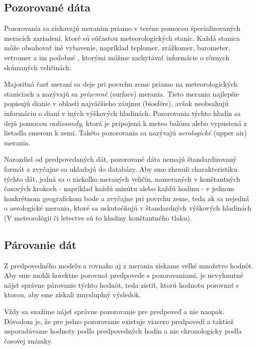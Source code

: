 \subsection{Pozorované dáta}
Pozorovania sa získavajú meraním priamo v teréne pomocou špecializovaných meracích zariadení, ktoré sú súčasťou meteorologických staníc. Každá stanica môže obsahovať iné vybavenie, napríklad teplomer, zrážkomer, barometer, vetromer a im podobné \cite{WeatherStation}, ktorými môžme zachytávať informácie o rôznych skúmaných veličinách. 

Majoritná časť meraní sa deje pri povrchu zeme priamo na meteorologických staniciach a nazývajú sa \textit{prízemné} (surface) merania. Tieto merania najlepšie popisujú dianie v oblasti najväčšieho záujmu (biosfére), avšak neobsahujú informáciu o dianí v iných výškových hladinách. Pozorovania týchto hladín sa dejú pomocou \textit{radiosondy}, ktorá je pripojená k meteo balónu alebo vypustená z lietadla smerom k zemi. Takéto pozorovania sa nazývajú \textit{aerologické} (upper air) merania.

Narozdiel od predpovedaných dát, pozorované dáta nemajú štandardizovaný formát a zvyčajne sa ukladajú do databázy.
Aby sme zhrnuli charakteristiku týchto dát, jedná sa o niekoľko meraných veličín, nameraných v konštantných časových krokoch - napríklad každú minútu alebo každú hodinu - v jednom konkrétnom geografickom bode a zvyčajne pri povrchu zeme, teda ak sa nejedná o aerologické merania, ktoré sa uskutočňujú v štandardných výškových hladinách (V meteorológii či letectve sú to hladiny konštantného tlaku). 

\subsection{Párovanie dát}
\label{subsec:pairing}
Z predpovedného modelu a rovnako aj z merania získame veľké množstvo hodnôt. Aby sme mohli korektne porovnať predpovede s pozorovaniami, je nevyhnutné nájsť správne párovanie týchto hodnôt, teda zistiť, ktorú hodnotu porovnať s ktorou, aby sme získali zmysluplný výsledok.

Vždy sa snažíme nájsť správne pozorovanie pre predpoveď a nie naopak.
Dôvodom je, že pre jedno pozorovanie existuje viacero predpovedí a taktiež usporadúvame hodnoty podľa predpovedných hodín a nie chronologicky podľa časovej známky.

